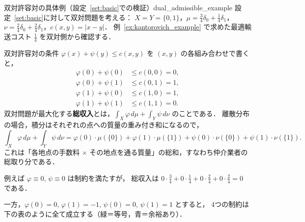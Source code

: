 \documentclass[uplatex, dvipdfmx]{jsarticle}
\begin{document}
\begin{example}{双対許容対の具体例（設定~\ref{set:basic}での検証）}{dual_admissible_example}
設定~\ref{set:basic}に対して双対問題を考える：
$X=Y=\{0,1\}$，$\mu=\tfrac{3}{4}\delta_0+\tfrac{1}{4}\delta_1$，
$\nu=\tfrac{2}{4}\delta_0+\tfrac{2}{4}\delta_1$，$c(x,y)=|x-y|$．
例~\ref{ex:kantorovich_example} で求めた最適輸送コスト $\tfrac{1}{4}$ を双対側から確認する．

双対許容対の条件 $\varphi(x)+\psi(y)\le c(x,y)$ を $(x,y)$ の各組み合わせで書くと，
\begin{align*}
  \varphi(0)+\psi(0) &\le c(0,0) = 0, \\
  \varphi(0)+\psi(1) &\le c(0,1) = 1, \\
  \varphi(1)+\psi(0) &\le c(1,0) = 1, \\
  \varphi(1)+\psi(1) &\le c(1,1) = 0.
\end{align*}
双対問題が最大化する\textbf{総収入}とは，$\int_X\varphi\,d\mu+\int_Y\psi\,d\nu$ のことである．
離散分布の場合，積分はそれぞれの点への質量の重み付き和になるので，
\[
  \int_X\varphi\,d\mu+\int_Y\psi\,d\nu
  = \varphi(0)\cdot\mu(\{0\})+\varphi(1)\cdot\mu(\{1\})
    +\psi(0)\cdot\nu(\{0\})+\psi(1)\cdot\nu(\{1\}).
\]
これは「各地点の手数料 × その地点を通る質量」の総和，すなわち仲介業者の総取り分である．

例えば $\varphi\equiv 0,\,\psi\equiv 0$ は制約を満たすが，
総収入は $0\cdot\tfrac{3}{4}+0\cdot\tfrac{1}{4}+0\cdot\tfrac{2}{4}+0\cdot\tfrac{2}{4}=0$ である．

一方，$\varphi(0)=0,\,\varphi(1)=-1,\,\psi(0)=0,\,\psi(1)=1$ とすると，
4つの制約は下の表のように全て成立する（緑＝等号，青＝余裕あり）．

\begin{center}
\end{center}
\end{example}
\end{document}
